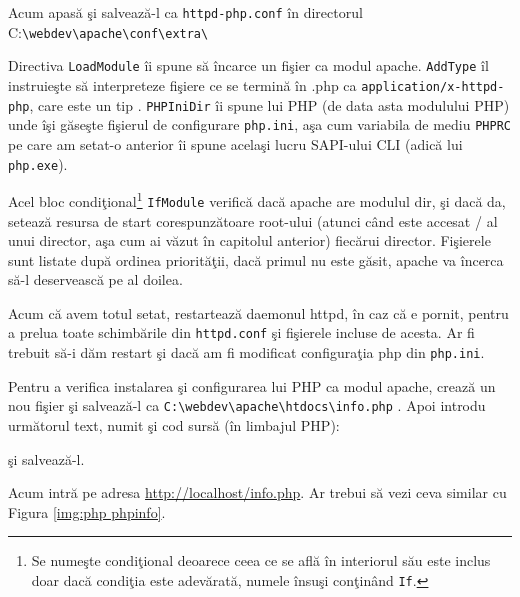 Acum apasă  şi salvează-l ca \texttt{httpd-php.conf}
în directorul
C:\texttt{{\textbackslash}webdev{\textbackslash}apache{\textbackslash}conf{\textbackslash}extra{\textbackslash}}

Directiva \texttt{LoadModule} îi spune să încarce un fişier ca modul apache. \texttt{AddType}
îl instruieşte să interpreteze fişiere ce se termină în .php ca 
\texttt{application/x-httpd-php}, care este un tip 
.
\texttt{PHPIniDir} îi spune lui PHP (de data asta modulului PHP) unde îşi găseşte fişierul
de configurare \texttt{php.ini}, aşa cum variabila de mediu \texttt{PHPRC} pe care
am setat-o anterior îi spune acelaşi lucru SAPI-ului CLI (adică lui \texttt{php.exe}).

Acel bloc condiţional\footnote{Se numeşte condiţional deoarece ceea ce se află
în interiorul său este inclus doar dacă condiţia este adevărată, numele însuşi
conţinând \texttt{If}.}
 \texttt{IfModule} verifică dacă apache are modulul {\glqq}dir{\grqq}, şi dacă
da, setează resursa de start corespunzătoare root-ului (atunci când este accesat {\glqq}/{\grqq}
al unui director, aşa cum ai văzut în capitolul anterior) fiecărui director. Fişierele
sunt listate după ordinea priorităţii, dacă primul nu este găsit, apache va încerca să-l
deservească pe al doilea.


Acum că avem totul setat, restartează daemonul httpd, în caz că e pornit, pentru a prelua
toate schimbările din \texttt{httpd.conf} şi fişierele incluse de acesta. Ar fi trebuit să-i
dăm restart şi dacă am fi modificat configuraţia php din \texttt{php.ini}.

Pentru a verifica instalarea şi configurarea lui PHP ca modul apache, crează un nou fişier
şi salvează-l ca 
\texttt{C:{\textbackslash}webdev{\textbackslash}apache{\textbackslash}htdocs{\textbackslash}info.php}
. Apoi introdu următorul text, numit şi cod sursă (în limbajul PHP):

şi salvează-l. 

Acum intră pe adresa \url{http://localhost/info.php}. Ar trebui să vezi ceva similar cu Figura \ref{img:php phpinfo}.

